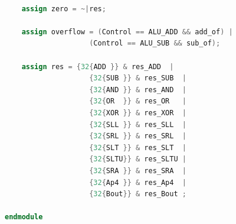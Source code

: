\begin{lstlisting}[language = {verilog}]
	
	assign zero = ~|res;
	
	assign overflow = (Control == ALU_ADD && add_of) | 
					(Control == ALU_SUB && sub_of);
	
	assign res = {32{ADD }} & res_ADD  |
					{32{SUB }} & res_SUB  |
					{32{AND }} & res_AND  |
					{32{OR  }} & res_OR   |
					{32{XOR }} & res_XOR  |
					{32{SLL }} & res_SLL  |
					{32{SRL }} & res_SRL  |
					{32{SLT }} & res_SLT  |
					{32{SLTU}} & res_SLTU |
					{32{SRA }} & res_SRA  |
					{32{Ap4 }} & res_Ap4  |
					{32{Bout}} & res_Bout ;

endmodule
\end{lstlisting}